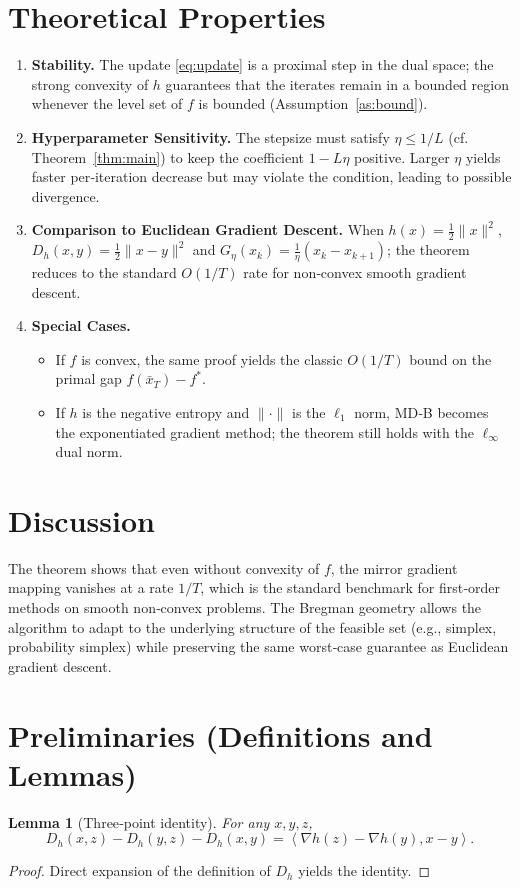 \documentclass{article}
\newtheorem{lemma}{Lemma}
\newcommand{\inner}[2]{\left\langle #1,#2\right\rangle}
\newcommand{\Breg}[2]{D_{h}(#1,#2)}
\begin{document}
\section*{Theoretical Properties}
\begin{enumerate}
\item \textbf{Stability.} The update \eqref{eq:update} is a proximal step in the dual space; the strong convexity of $h$ guarantees that the iterates remain in a bounded region whenever the level set of $f$ is bounded (Assumption~\ref{as:bound}).
\item \textbf{Hyperparameter Sensitivity.} The stepsize must satisfy $\eta\le 1/L$ (cf. Theorem~\ref{thm:main}) to keep the coefficient $1-L\eta$ positive. Larger $\eta$ yields faster per‑iteration decrease but may violate the condition, leading to possible divergence.
\item \textbf{Comparison to Euclidean Gradient Descent.} When $h(x)=\tfrac12\|x\|^{2}$, $\Breg{x}{y}=\tfrac12\|x-y\|^{2}$ and $G_{\eta}(x_{k})=\tfrac{1}{\eta}(x_{k}-x_{k+1})$; the theorem reduces to the standard $O(1/T)$ rate for non‑convex smooth gradient descent.
\item \textbf{Special Cases.}
\begin{itemize}
\item If $f$ is convex, the same proof yields the classic $O(1/T)$ bound on the primal gap $f(\bar x_{T})-f^{*}$.
\item If $h$ is the negative entropy and $\|\cdot\|$ is the $\ell_{1}$ norm, MD‑B becomes the exponentiated gradient method; the theorem still holds with the $\ell_{\infty}$ dual norm.
\end{itemize}
\end{enumerate}

\section*{Discussion}
The theorem shows that even without convexity of $f$, the mirror gradient mapping vanishes at a rate $1/T$, which is the standard benchmark for first‑order methods on smooth non‑convex problems. The Bregman geometry allows the algorithm to adapt to the underlying structure of the feasible set (e.g., simplex, probability simplex) while preserving the same worst‑case guarantee as Euclidean gradient descent.

\section*{Preliminaries (Definitions and Lemmas)}
\begin{lemma}[Three‑point identity]\label{lem:three}
For any $x,y,z$,
\[
\Breg{x}{z}-\Breg{y}{z}-\Breg{x}{y}
=\inner{\nabla h(z)-\nabla h(y)}{x-y}.
\]
\end{lemma}
\begin{proof}
Direct expansion of the definition of $D_{h}$ yields the identity. \hfill\qedsymbol
\end{proof}
\end{document}
